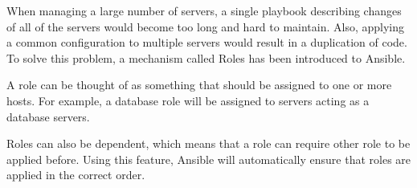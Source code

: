 When managing a large number of servers, a single playbook describing changes of all of the servers would become too long and hard to maintain. Also, applying a common configuration to multiple servers would result in a duplication of code. To solve this problem, a mechanism called Roles has been introduced to Ansible. \cite{AnsibleDoc}

A role can be thought of as something that should be assigned to one or more hosts. For example, a database role will be assigned to servers acting as a database servers.

Roles can also be dependent, which means that a role can require other role to be applied before. Using this feature, Ansible will automatically ensure that roles are applied in the correct order.
